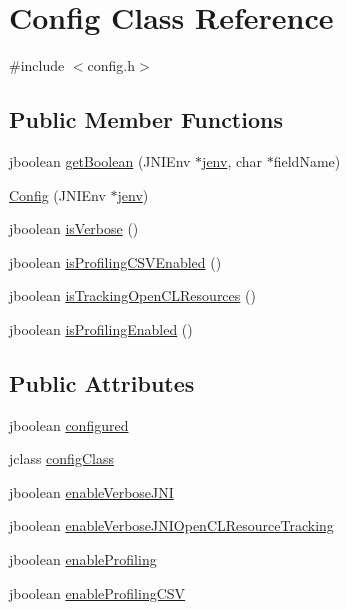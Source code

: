 \hypertarget{class_config}{\section{Config Class Reference}
\label{class_config}
}


{\ttfamily \#include $<$config.\-h$>$}

\subsection*{Public Member Functions}
\begin{DoxyCompactItemize}
\item 
jboolean \hyperlink{class_config_a7d99bbf69b5d0632196a2da20294963c}{get\-Boolean} (J\-N\-I\-Env $\ast$\hyperlink{aparapi_8cpp_a31595c73e9a3750524b2ff61b5a14f96}{jenv}, char $\ast$field\-Name)
\item 
\hyperlink{class_config_a15f0fb9274e3f774cb6922e2eecf7208}{Config} (J\-N\-I\-Env $\ast$\hyperlink{aparapi_8cpp_a31595c73e9a3750524b2ff61b5a14f96}{jenv})
\item 
jboolean \hyperlink{class_config_a03234dbe1adbe1c8fdde649df372926c}{is\-Verbose} ()
\item 
jboolean \hyperlink{class_config_a6038fb1fbd5089d24afa3b71fd6c0220}{is\-Profiling\-C\-S\-V\-Enabled} ()
\item 
jboolean \hyperlink{class_config_a7a2cfa5be8d976099dedb684e9c32ca0}{is\-Tracking\-Open\-C\-L\-Resources} ()
\item 
jboolean \hyperlink{class_config_ac91f68d97d5ca75b787d6ea9cba882e4}{is\-Profiling\-Enabled} ()
\end{DoxyCompactItemize}
\subsection*{Public Attributes}
\begin{DoxyCompactItemize}
\item 
jboolean \hyperlink{class_config_a84a74c64a238bf8c965c475de0b17124}{configured}
\item 
jclass \hyperlink{class_config_a7e79ccce393887ace81c263dbc82b0e1}{config\-Class}
\item 
jboolean \hyperlink{class_config_af48b23080ff93b7f7720f228715c4eb2}{enable\-Verbose\-J\-N\-I}
\item 
jboolean \hyperlink{class_config_a40e02509e9330fa8d16087e7dde8a977}{enable\-Verbose\-J\-N\-I\-Open\-C\-L\-Resource\-Tracking}
\item 
jboolean \hyperlink{class_config_a403c9cdc52ef31d933ee055d3165a35e}{enable\-Profiling}
\item 
jboolean \hyperlink{class_config_afb0e37ad017cbf220fcac529fa644944}{enable\-Profiling\-C\-S\-V}
\end{DoxyCompactItemize}


